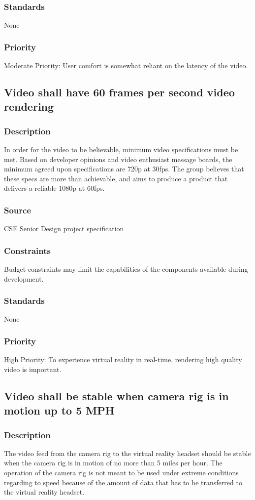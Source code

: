 \subsubsection{Standards}
None
\subsubsection{Priority}
Moderate Priority: User comfort is somewhat reliant on the latency of the video.

\subsection{Video shall have 60 frames per second video rendering}
\subsubsection{Description}
In order for the video to be believable, minimum video specifications must be met. Based on developer opinions and video enthusiast message boards, the minimum agreed upon specifications are 720p at 30fps. The group believes that these specs are more than achievable, and aims to produce a product that delivers a reliable 1080p at 60fps.
\subsubsection{Source}
CSE Senior Design project specification
\subsubsection{Constraints}
Budget constraints may limit the capabilities of the components available during development.
\subsubsection{Standards}
None
\subsubsection{Priority}
High Priority: To experience virtual reality in real-time, rendering high quality video is important.

\subsection{Video shall be stable when camera rig is in motion up to 5 MPH}
\subsubsection{Description}
The video feed from the camera rig to the virtual reality headset should be stable when the camera rig is in motion of no more than 5 miles per hour. The operation of the camera rig is not meant to be used under extreme conditions regarding to speed because of the amount of data that has to be transferred to the virtual reality headset.
